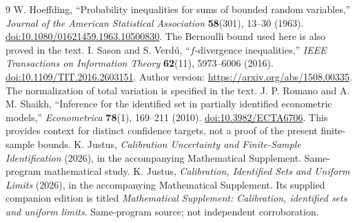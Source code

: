 \documentclass[11pt,a4paper]{article}
\begin{document}
\clearpage
\begin{thebibliography}{9}
 W. Hoeffding, ``Probability inequalities for sums of bounded random variables,'' \emph{Journal of the American Statistical Association} \textbf{58}(301), 13--30 (1963). \href{https://doi.org/10.1080/01621459.1963.10500830}{doi:10.1080/01621459.1963.10500830}. The Bernoulli bound used here is also proved in the text.
 I. Sason and S. Verd\'u, ``$f$-divergence inequalities,'' \emph{IEEE Transactions on Information Theory} \textbf{62}(11), 5973--6006 (2016). \href{https://doi.org/10.1109/TIT.2016.2603151}{doi:10.1109/TIT.2016.2603151}. Author version: \url{https://arxiv.org/abs/1508.00335}. The normalization of total variation is specified in the text.
 J. P. Romano and A. M. Shaikh, ``Inference for the identified set in partially identified econometric models,'' \emph{Econometrica} \textbf{78}(1), 169--211 (2010). \href{https://doi.org/10.3982/ECTA6706}{doi:10.3982/ECTA6706}. This provides context for distinct confidence targets, not a proof of the present finite-sample bounds.
 K. Justus, \emph{Calibration Uncertainty and Finite-Sample Identification} (2026), in the accompanying Mathematical Supplement. Same-program mathematical study.
 K. Justus, \emph{Calibration, Identified Sets and Uniform Limits} (2026), in the accompanying Mathematical Supplement. Its supplied companion edition is titled \emph{Mathematical Supplement: Calibration, identified sets and uniform limits}. Same-program source; not independent corroboration.
\end{thebibliography}
\end{document}
